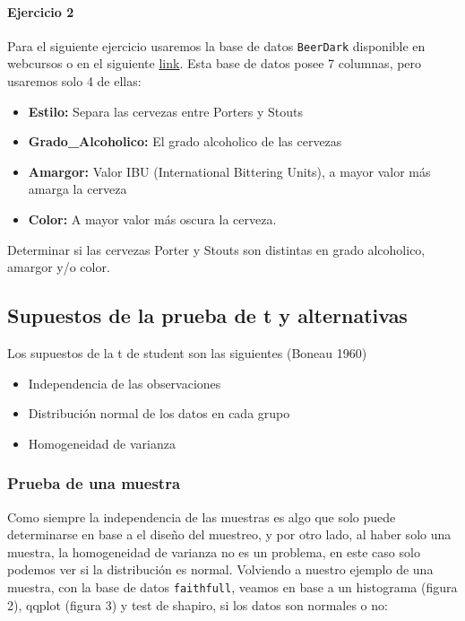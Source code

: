 \documentclass[]{article}
\providecommand{\tightlist}{%
  \setlength{\itemsep}{0pt}\setlength{\parskip}{0pt}}
\let\oldparagraph\paragraph
\renewcommand{\paragraph}[1]{\oldparagraph{#1}\mbox{}}
\begin{document}
\paragraph{Ejercicio 2}\label{ejercicio-2}

Para el siguiente ejercicio usaremos la base de datos \texttt{BeerDark}
disponible en webcursos o en el siguiente
\href{https://archive.org/download/BeerDark/BeerDark.csv}{link}. Esta
base de datos posee 7 columnas, pero usaremos solo 4 de ellas:

\begin{itemize}
\tightlist
\item
  \textbf{Estilo:} Separa las cervezas entre Porters y Stouts
\item
  \textbf{Grado\_Alcoholico:} El grado alcoholico de las cervezas
\item
  \textbf{Amargor:} Valor IBU (International Bittering Units), a mayor
  valor más amarga la cerveza
\item
  \textbf{Color:} A mayor valor más oscura la cerveza.
\end{itemize}

Determinar si las cervezas Porter y Stouts son distintas en grado
alcoholico, amargor y/o color.

\subsection{Supuestos de la prueba de t y
alternativas}\label{supuestos-de-la-prueba-de-t-y-alternativas}

Los supuestos de la t de student son las siguientes (Boneau 1960)

\begin{itemize}
\tightlist
\item
  Independencia de las observaciones
\item
  Distribución normal de los datos en cada grupo
\item
  Homogeneidad de varianza
\end{itemize}

\subsubsection{Prueba de una muestra}\label{prueba-de-una-muestra}

Como siempre la independencia de las muestras es algo que solo puede
determinarse en base a el diseño del muestreo, y por otro lado, al haber
solo una muestra, la homogeneidad de varianza no es un problema, en este
caso solo podemos ver si la distribución es normal. Volviendo a nuestro
ejemplo de una muestra, con la base de datos \texttt{faithfull}, veamos
en base a un histograma (figura 2), qqplot (figura 3) y test de shapiro,
si los datos son normales o no:
\end{document}
